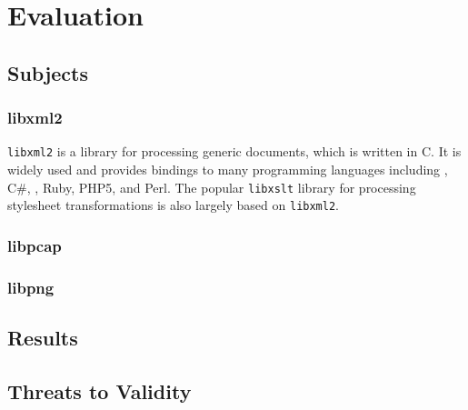 \section{Evaluation}
\label{sec:evaluation}
\subsection{Subjects}
\subsubsection{libxml2}
\texttt{libxml2} is a library for processing generic \xml documents, which is written in
{\small C}. It is widely used and provides bindings to many programming languages including \cpp, 
{\small C\#}, \python{}, {\small Ruby}, {\small PHP5}, and {\small Perl}. The popular \texttt{libxslt} library
for processing \xml stylesheet transformations is also largely based on \texttt{libxml2}.
\subsubsection{libpcap}
\subsubsection{libpng}
\subsection{Results}
\subsection{Threats to Validity}